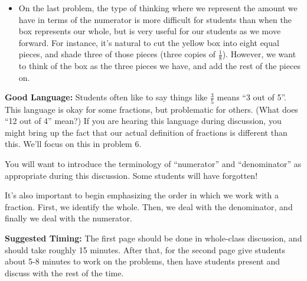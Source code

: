 \documentclass{ximera}
\begin{document}
\begin{instructorNotes}
\begin{itemize}
	\item On the last problem, the type of thinking where we represent the amount we have in terms of the numerator is more difficult for students than when the box represents our whole, but is very useful for our students as we move forward. For instance, it's natural to cut the yellow box into eight equal pieces, and shade three of those pieces (three copies of $\frac18$). However, we want to think of the   box as the three pieces we have, and add the rest of the pieces on.
\end{itemize}



{\bf Good Language:} Students often like to say things like $\frac{3}{5}$ means ``3 out of 5''. This language is okay for some fractions, but problematic for others. (What does ``12 out of 4'' mean?) If you are hearing this language during discussion, you might bring up the fact that our actual definition of fractions is different than this. We'll focus on this in problem 6.

You will want to introduce the terminology of ``numerator'' and ``denominator'' as appropriate during this discussion. Some students will have forgotten!

It's also important to begin emphasizing the order in which we work with a fraction. First, we identify the whole. Then, we deal with the denominator, and finally we deal with the numerator. 



{\bf Suggested Timing:} The first page should be done in whole-class discussion, and should take roughly 15 minutes. After that, for the second page give students about 5-8 minutes to work on the problems, then have students present and discuss with the rest of the time.

\end{instructorNotes}
\end{document}

